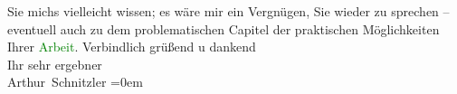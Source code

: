                     Sie michs vielleicht wissen; es wäre mir ein Vergnügen, Sie wieder zu sprechen –
                    eventuell auch zu dem problematischen Capitel der praktischen Möglichkeiten
                    Ihrer \textcolor{green}{Arbeit}{}.\pend
           \pstart
           Verbindlich grüßend u dankend{\\[\baselineskip]}Ihr sehr ergebner{\\[\baselineskip]}\spacefill\mbox{Arthur Schnitzler}\pend
           \leftskip=0em{}\endnumbering{}  
      